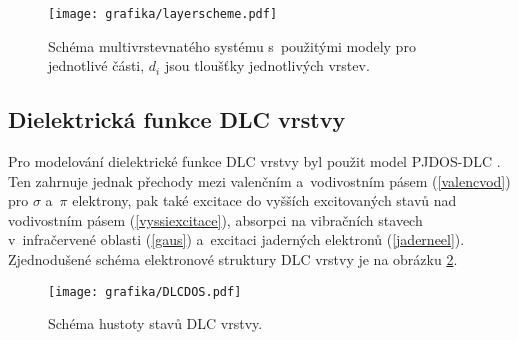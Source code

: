 \begin{figure}[btp]
\centering
\texttt{[image: grafika/layerscheme.pdf]}
\caption{Schéma multivrstevnatého systému s~použitými modely pro jednotlivé části, $d_i$ jsou tloušťky jednotlivých vrstev.}
\label{layerscheme}
\end{figure} 

\subsection{Dielektrická funkce DLC vrstvy}
Pro modelování dielektrické funkce DLC vrstvy byl použit model PJDOS-DLC \cite{Franta2007}. Ten zahrnuje jednak přechody mezi valenčním a~vodivostním pásem (\ref{valencvod}) pro $\sigma$ a~$\pi$ elektrony, pak také excitace do vyšších excitovaných stavů nad vodivostním pásem (\ref{vyssiexcitace}), absorpci na vibračních stavech v~infračervené oblasti (\ref{gaus}) a~excitaci jaderných elektronů (\ref{jaderneel}). Zjednodušené schéma elektronové struktury DLC vrstvy je na obrázku \ref{DLCDOS}.

\begin{figure}[btp]
\centering
\texttt{[image: grafika/DLCDOS.pdf]}
\caption{Schéma hustoty stavů DLC vrstvy.}
\label{DLCDOS}
\end{figure} 


